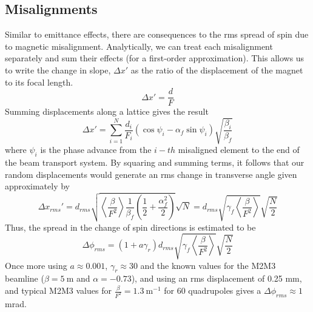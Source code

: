 \documentclass[12pt]{article}
\begin{document}
\subsection{Misalignments}
Similar to emittance effects, there are consequences to the rms spread of spin due to magnetic misalignment.   Analytically, we can treat each misalignment separately and sum their effects (for a first-order approximation). This allows us to write the change in slope, $\Delta x'$ as the ratio of the displacement of the magnet to its focal length. 
\begin{equation}
\Delta x' = \frac{d}{F}
\end{equation}
Summing displacements along a lattice gives the result
\begin{equation}
\Delta x' = \sum_{i=1}^N \frac{d_i}{F_i}(\cos \psi_i - \alpha_f \sin \psi_i) \sqrt{\frac{\beta_i}{\beta_f}}
\end{equation}
where $\psi_i$ is the phase advance from the $i-th$ misaligned element to the end of the beam transport system.  By squaring and summing terms, it follows that our random displacements would generate an rms change in transverse angle given approximately by
\begin{equation}
\Delta x_{rms}' = d_{rms} \sqrt{ \left< \frac{\beta}{F^2} \right> \frac{1}{\beta_f} \left( \frac{1}{2} + \frac{\alpha_f^2}{2} \right)} \sqrt{N} = d_{rms} \sqrt{\gamma_f \left< \frac{\beta}{F^2} \right>} \sqrt{\frac{N}{2}}
\end{equation}
Thus, the spread in the change of spin directions is estimated to be
\begin{equation}
\Delta \phi_{rms} = (1 + a \gamma_r) d_{rms} \sqrt{\gamma_f \left< \frac{\beta}{F^2} \right>} \sqrt{\frac{N}{2}}
\end{equation}
Once more using $a \approx 0.001$, $\gamma_r \approx 30$ and the known values for the M2M3 beamline ($\beta = 5~$m and  $\alpha = -0.73$), and using an rms displacement of 0.25 mm, and typical M2M3 values for $\frac{\beta}{F^2} = 1.3~\mathrm{m}^{-1}$ for 60 quadrupoles gives a $\Delta \phi_{rms} \approx 1$ mrad.
\end{document}
